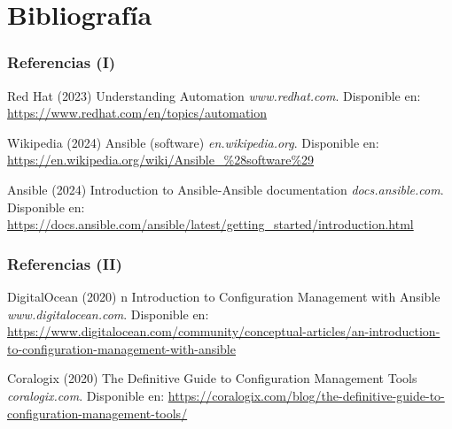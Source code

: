 \documentclass[
	11pt, %
]{beamer}
\begin{document}
\section{Bibliografía}

\begin{frame} %
	\frametitle{Referencias (I)}

	\begin{thebibliography}{99} %
		\footnotesize %

		Red Hat (2023)
		\newblock Understanding Automation
		\newblock \emph{www.redhat.com}. Disponible en: \url{https://www.redhat.com/en/topics/automation}

		Wikipedia (2024)
		\newblock Ansible (software)
		\newblock \emph{en.wikipedia.org}. Disponible en: \url{https://en.wikipedia.org/wiki/Ansible\_\%28software\%29}

		Ansible (2024)
		\newblock Introduction to Ansible-Ansible documentation
		\newblock \emph{docs.ansible.com}. Disponible en: \url{https://docs.ansible.com/ansible/latest/getting_started/introduction.html}

	\end{thebibliography}
\end{frame}


\begin{frame} %
	\frametitle{Referencias (II)}

	\begin{thebibliography}{99} %
		\footnotesize %

		DigitalOcean (2020)
		n {I}ntroduction to {C}onfiguration {M}anagement with {A}nsible
		\newblock \emph{www.digitalocean.com}. Disponible en: \url{https://www.digitalocean.com/community/conceptual-articles/an-introduction-to-configuration-management-with-ansible}

		Coralogix (2020)
		\newblock The Definitive Guide to Configuration Management Tools
		\newblock \emph{coralogix.com}. Disponible en: \url{https://coralogix.com/blog/the-definitive-guide-to-configuration-management-tools/}
	\end{thebibliography}
\end{frame}
\end{document}
